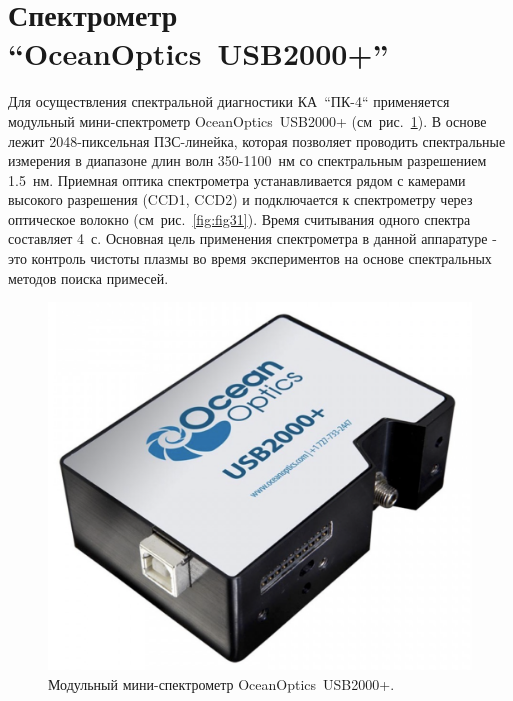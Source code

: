 \section{Спектрометр “OceanOptics~USB2000+”}
Для осуществления спектральной диагностики КА~“ПК-4“ применяется модульный мини-спектрометр OceanOptics~USB2000+ (см~рис.~\ref{fig:usb2000+}).
В основе лежит 2048-пиксельная ПЗС-линейка, которая позволяет проводить спектральные измерения в диапазоне длин
волн 350-1100~нм со спектральным разрешением 1.5~нм. Приемная оптика спектрометра устанавливается рядом
с камерами высокого разрешения (CCD1, CCD2) и подключается к спектрометру через оптическое волокно (см~рис.~\ref{fig:fig31}).
Время считывания одного спектра составляет 4~с. Основная цель применения спектрометра в данной аппаратуре - это
контроль чистоты плазмы во время экспериментов на основе спектральных методов поиска примесей.
\begin{figure}[t]
  \centering
  \includegraphics[width=12cm]{figures/usb2000+}
  \caption{Модульный мини-спектрометр OceanOptics~USB2000+.}
  \label{fig:usb2000+}
\end{figure}

